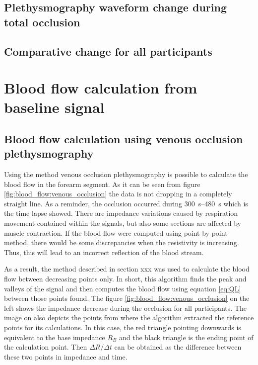 \subsection{Plethysmography waveform change during total occlusion}
\label{section5.3.3}

\subsection{Comparative change for all participants}
\label{section5.3.4}


\pagebreak
\section{Blood flow calculation from baseline signal}
\label{section5.4}

\subsection{Blood flow calculation using venous occlusion plethysmography}
\label{section5.4.1}
Using the method venous occlusion plethysmography is possible to calculate the blood flow in the forearm segment. As it can be seen from figure \ref{fig:blood_flow:venous_occlusion} the data is not dropping in a completely straight line. As a reminder, the occlusion occurred during \SIrange{300}{480}{\second} which is the time lapse showed. There are impedance variations caused by respiration movement contained within the signals, but also some sections are affected by muscle contraction. If the blood flow were computed using point by point method, there would be some discrepancies when the resistivity is increasing. Thus, this will lead to an incorrect reflection of the blood stream. 

As a result, the method described in section xxx was used to calculate the blood flow between decreasing points only. In short, this algorithm finds the peak and valleys of the signal and then computes the blood flow using equation \ref{eq:QL} between those points found. The figure \ref{fig:blood_flow:venous_occlusion} on the left shows the impedance decrease during the occlusion for all participants. The image on also depicts the points from where the algorithm extracted the reference points for its calculations. In this case, the red triangle pointing downwards is equivalent to the base impedance $R_B$ and the black triangle is the ending point of the calculation point. Then $\Delta R / \Delta t$ can be obtained as the difference between these two points in impedance and time. 

